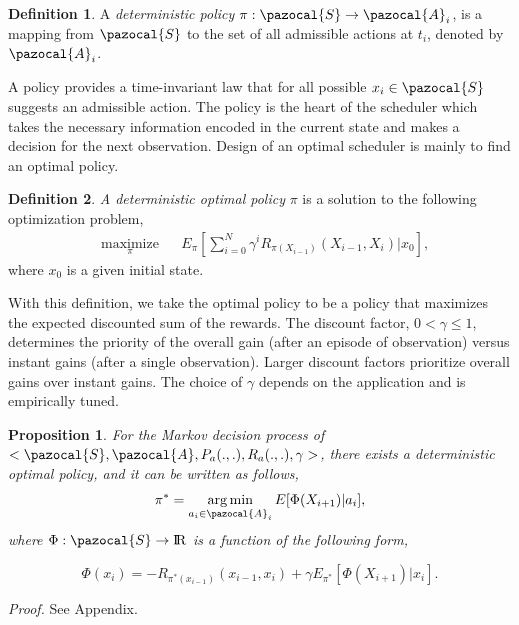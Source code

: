 \documentclass[12pt]{aastex62}
\newtheorem{prop}{Proposition}
\theoremstyle{definition}
\newtheorem{defn}{Definition}
\DeclareMathOperator*{\argmin}{arg\,min}
\begin{document}
\begin{defn}
A \textit{deterministic policy} $\pi : \pazocal{S} \rightarrow \pazocal{A}_i$, is a mapping from $\pazocal{S}$ to the set of all admissible actions at $t_i$, denoted by $\pazocal{A}_i$. 
\end{defn}
%
A policy provides a time-invariant law that for all possible $x_i \in \pazocal{S}$ suggests an admissible action. The policy is the heart of the scheduler which takes the necessary information encoded in the current state and makes a decision for the next observation. Design of an optimal scheduler is mainly to find an optimal policy.

\begin{defn}
\textit{A deterministic optimal policy} $\pi$ is a solution to the following optimization problem,
\begin{equation}\label{equ_opt1}
\begin{aligned}
& \underset{\pi}{\text{maximize}}
& & E_{\pi}[\sum_{i = 0}^N \gamma^i R_{\pi(X_{i-1})}(X_{i-1}, X_{i}) | x_0],
\end{aligned}
\end{equation}
where $x_0$ is a given initial state.
\end{defn}
%
With this definition, we take the optimal policy to be a policy that maximizes the expected discounted sum of the rewards. The discount factor, $0 < \gamma \leq 1$, determines the priority of the overall gain (after an episode of observation) versus instant gains (after a single observation). Larger discount factors prioritize overall gains over instant gains. The choice of $\gamma$ depends on the application and is empirically tuned. 
%
\begin{prop} \label{prop_main}
For the Markov decision process of $<\pazocal{S},\pazocal{A}, P_a(.,.), R_a(.,.), \gamma>$, there exists a deterministic optimal policy, and it can be written as follows, 
\begin{equation}\label{equ_opt_pol}
\pi^*= \argmin_{a_{i} \in \pazocal{A}_i} E[\Phi(X_{{i+1}}) | a_{i}],
\end{equation}
where $\Phi: \pazocal{S} \rightarrow \rm I\!R$ is a function of the following form,

\begin{equation}\label{equ_phi_compatible}
\Phi(x_{i}) =  - R_{\pi^*(x_{i-1})}(x_{i-1},x_i)  + \gamma E_{\pi^*}[\Phi(X_{{i+1}})|x_i].
\end{equation}
\end{prop}

\textit{Proof.} See Appendix.
\end{document}
